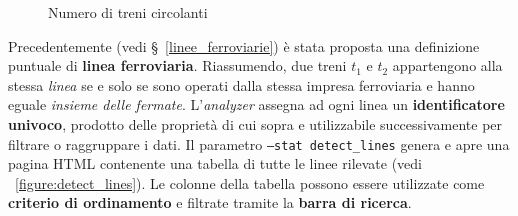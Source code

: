 \documentclass[12pt,italian]{report}
\begin{document}
\begin{figure}[p] \centering
     \vspace{5mm}
    \caption{Numero di treni circolanti}
\end{figure}

Precedentemente (vedi \S~\ref{linee_ferroviarie}) è stata proposta una
definizione puntuale di \textbf{linea ferroviaria}.  Riassumendo, due
treni $t_1$ e $t_2$ appartengono alla stessa \textit{linea} se e solo
se sono operati dalla stessa impresa ferroviaria e hanno eguale
\textit{insieme delle fermate}.  L'\textit{analyzer} assegna ad ogni
linea un \textbf{identificatore univoco}, prodotto delle proprietà di
cui sopra e utilizzabile successivamente per filtrare o raggruppare i
dati.  Il parametro \texttt{--stat detect\_\-lines} genera e apre una
pagina HTML contenente una tabella di tutte le linee rilevate (vedi
\figurename~\ref{figure:detect_lines}).  Le colonne della tabella
possono essere utilizzate come \textbf{criterio di ordinamento} e
filtrate tramite la \textbf{barra di ricerca}.
\end{document}
